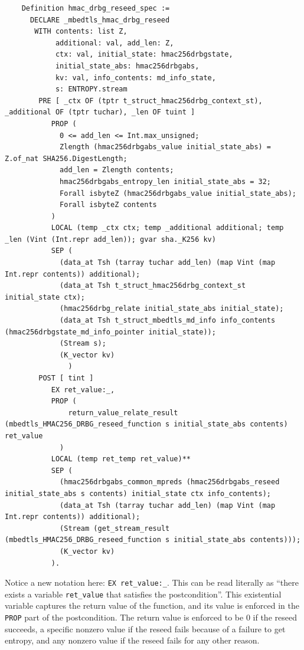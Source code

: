 \documentclass[pageno]{jpaper}
\begin{document}
\begin{lstlisting}
    Definition hmac_drbg_reseed_spec :=
      DECLARE _mbedtls_hmac_drbg_reseed
       WITH contents: list Z,
            additional: val, add_len: Z,
            ctx: val, initial_state: hmac256drbgstate,
            initial_state_abs: hmac256drbgabs,
            kv: val, info_contents: md_info_state,
            s: ENTROPY.stream
        PRE [ _ctx OF (tptr t_struct_hmac256drbg_context_st), _additional OF (tptr tuchar), _len OF tuint ]
           PROP (
             0 <= add_len <= Int.max_unsigned;
             Zlength (hmac256drbgabs_value initial_state_abs) = Z.of_nat SHA256.DigestLength;
             add_len = Zlength contents;
             hmac256drbgabs_entropy_len initial_state_abs = 32;
             Forall isbyteZ (hmac256drbgabs_value initial_state_abs);
             Forall isbyteZ contents
           )
           LOCAL (temp _ctx ctx; temp _additional additional; temp _len (Vint (Int.repr add_len)); gvar sha._K256 kv)
           SEP (
             (data_at Tsh (tarray tuchar add_len) (map Vint (map Int.repr contents)) additional);
             (data_at Tsh t_struct_hmac256drbg_context_st initial_state ctx);
             (hmac256drbg_relate initial_state_abs initial_state);
             (data_at Tsh t_struct_mbedtls_md_info info_contents (hmac256drbgstate_md_info_pointer initial_state));
             (Stream s);
             (K_vector kv)
               )
        POST [ tint ]
           EX ret_value:_,
           PROP (
               return_value_relate_result (mbedtls_HMAC256_DRBG_reseed_function s initial_state_abs contents) ret_value
             )
           LOCAL (temp ret_temp ret_value)**
           SEP (
             (hmac256drbgabs_common_mpreds (hmac256drbgabs_reseed initial_state_abs s contents) initial_state ctx info_contents);
             (data_at Tsh (tarray tuchar add_len) (map Vint (map Int.repr contents)) additional);
             (Stream (get_stream_result (mbedtls_HMAC256_DRBG_reseed_function s initial_state_abs contents)));
             (K_vector kv)
           ).
\end{lstlisting}

Notice a new notation here: \lstinline{EX ret_value:_}. This can be read literally as “there exists a variable \lstinline{ret_value} that satisfies the postcondition”. This existential variable captures the return value of the function, and its value is enforced in the \lstinline{PROP} part of the postcondition. The return value is enforced to be 0 if the reseed succeeds, a specific nonzero value if the reseed fails because of a failure to get entropy, and any nonzero value if the reseed fails for any other reason.
\end{document}
